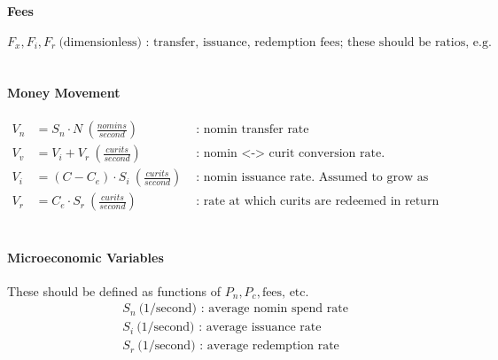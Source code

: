 \documentclass{article}
\begin{document}
\paragraph{Fees}
\[F_x, F_i, F_r \ \text{(dimensionless) : transfer, issuance, redemption fees; these should be ratios, e.g. 0.1\%}\]
\\


\paragraph{Money Movement}
\begin{align*}
V_n &= S_n \cdot N \ (\frac{nomins}{second}) & \text{ : nomin transfer rate} \\
V_v &= V_i + V_r \ (\frac{curits}{second}) & \text{ : nomin <-> curit conversion rate.} \\
V_i &= (C - C_e) \cdot S_i \ (\frac{curits}{second}) & \text{ : nomin issuance rate. Assumed to grow as there are more free curits in the system (actually should probably grow with the number of escrowed but unissued nomins).} \\
V_r &= C_e \cdot S_r \ (\frac{curits}{second}) & \text{ : rate at which curits are redeemed in return for nomins (which are burned). Assumed to grow proportionally with the number of escrowed curits.}
\end{align*}
\\

\paragraph{Microeconomic Variables} These should be defined as functions of $P_n, P_c, \text{fees, etc.}$
\begin{align*}
& S_n \ \text{(1/second) : average nomin spend rate} \\
& S_i \ \text{(1/second) : average issuance rate} \\
& S_r \ \text{(1/second) : average redemption rate}
\end{align*}
\end{document}
